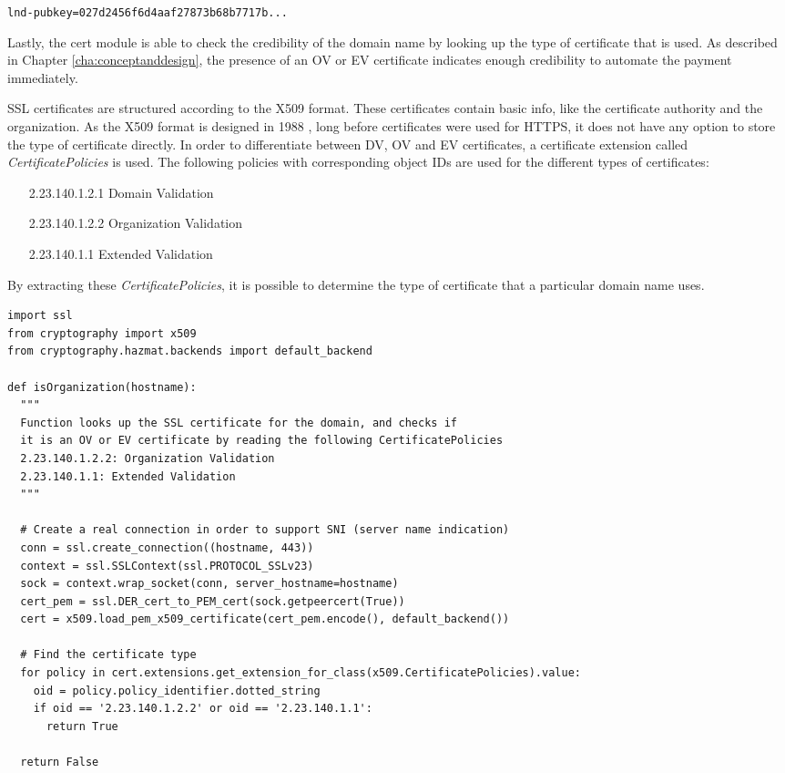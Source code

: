 \texttt{lnd-pubkey=027d2456f6d4aaf27873b68b7717b...}

Lastly, the cert module is able to check the credibility of the domain name by looking up the type of certificate that is used. As described in Chapter \ref{cha:conceptanddesign}, the presence of an OV or EV certificate indicates enough credibility to automate the payment immediately. 

SSL certificates are structured according to the X509 format. These certificates contain basic info, like the certificate authority and the organization. As the X509 format is designed in 1988 \cite{biddle2009browser}, long before certificates were used for HTTPS, it does not have any option to store the type of certificate directly. In order to differentiate between DV, OV and EV certificates, a certificate extension called \textit{CertificatePolicies} is used. The following policies with corresponding object IDs are used for the different types of certificates:

\begin{enumerate}[leftmargin=8em]
  \item[2.23.140.1.2.1] Domain Validation
  \item[2.23.140.1.2.2] Organization Validation
  \item[2.23.140.1.1] Extended Validation
\end{enumerate}

By extracting these \textit{CertificatePolicies}, it is possible to determine the type of certificate that a particular domain name uses. 


\lstset{language=Python}
\lstset{frame=lines}
\lstset{basicstyle=\footnotesize}
\begin{lstlisting}
import ssl
from cryptography import x509
from cryptography.hazmat.backends import default_backend

def isOrganization(hostname):
  """
  Function looks up the SSL certificate for the domain, and checks if 
  it is an OV or EV certificate by reading the following CertificatePolicies
  2.23.140.1.2.2: Organization Validation
  2.23.140.1.1: Extended Validation 
  """

  # Create a real connection in order to support SNI (server name indication)
  conn = ssl.create_connection((hostname, 443))
  context = ssl.SSLContext(ssl.PROTOCOL_SSLv23)
  sock = context.wrap_socket(conn, server_hostname=hostname)
  cert_pem = ssl.DER_cert_to_PEM_cert(sock.getpeercert(True))
  cert = x509.load_pem_x509_certificate(cert_pem.encode(), default_backend())
  
  # Find the certificate type
  for policy in cert.extensions.get_extension_for_class(x509.CertificatePolicies).value:
    oid = policy.policy_identifier.dotted_string
    if oid == '2.23.140.1.2.2' or oid == '2.23.140.1.1':
      return True

  return False
\end{lstlisting}

